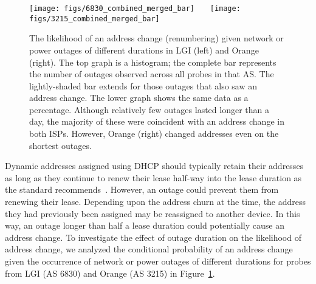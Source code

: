 

\begin{figure}[t]
  \texttt{[image: figs/6830\_combined\_merged\_bar]}~~~
  \texttt{[image: figs/3215\_combined\_merged\_bar]}

  \caption{\label{fig:outagedurs} The likelihood of an address change (renumbering)
    given network or power outages of different durations in LGI (left)
    and Orange (right).  The top graph is a histogram; the
    complete bar represents the number of outages observed
    across all probes in that AS.  The lightly-shaded bar
    extends for those outages that also saw an address
    change.  The lower graph shows the same data as a
    percentage.  Although relatively few outages
    lasted longer than a day, the majority of these were
    coincident with an address change in both ISPs. However,
    Orange (right) changed addresses even on the shortest
    outages.}
\end{figure}

Dynamic addresses assigned using DHCP should typically retain
their addresses as long as they continue to renew their lease half-way
into the lease duration as the standard
recommends~\cite{rfc2131}. However, an outage could
prevent them from renewing their lease. Depending upon the address
churn at the time, the address they had previously been assigned may
be reassigned to another device.  In this way, an outage
longer than half a lease duration could potentially cause an address
change. To investigate the effect of outage duration on the likelihood
of address change, we analyzed the conditional probability of an
address change given the occurrence of network or power outages of different durations
for probes from LGI (AS 6830) and
Orange (AS 3215) in Figure~\ref{fig:outagedurs}. 

